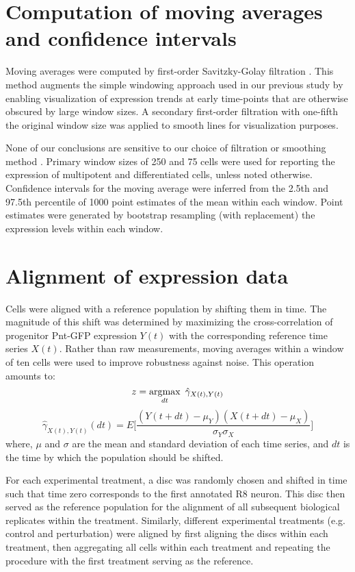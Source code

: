\section{Computation of moving averages and confidence intervals}
\label{appendix:ratio:moving_averages}

Moving averages were computed by first-order Savitzky-Golay filtration \cite{Savitzky1964}. This method augments the simple windowing approach used in our previous study \cite{Pelaez2015a} by enabling visualization of expression trends at early time-points that are otherwise obscured by large window sizes. A secondary first-order filtration with one-fifth the original window size was applied to smooth lines for visualization purposes.

None of our conclusions are sensitive to our choice of filtration or smoothing method \cite{Pelaez2015a}. Primary window sizes of 250 and 75 cells were used for reporting the expression of multipotent and differentiated cells, unless noted otherwise. Confidence intervals for the moving average were inferred from the 2.5th and 97.5th percentile of 1000 point estimates of the mean within each window. Point estimates were generated by bootstrap resampling (with replacement) the expression levels within each window.

\section{Alignment of expression data}
\label{appendix:ratio:alignment}

Cells were aligned with a reference population by shifting them in time. The magnitude of this shift was determined by maximizing the cross-correlation of progenitor Pnt-GFP expression $Y(t)$ with the corresponding reference time series $X(t)$. Rather than raw measurements, moving averages within a window of ten cells were used to improve robustness against noise. This operation amounts to:
\begin{equation}
z = \argmax_{dt} \ {\hat{\gamma}_{X(t),Y(t)}}
\end{equation}
\begin{equation}
\hat{\gamma}_{X(t),Y(t)} (dt) = E \Big[ \frac{(Y(t+dt)-\mu_Y)(X(t+dt)-\mu_X)}{\sigma_Y \sigma_X} \Big]
\end{equation}
where, $\mu$ and $\sigma$ are the mean and standard deviation of each time series, and $dt$ is the time by which the population should be shifted.

For each experimental treatment, a disc was randomly chosen and shifted in time such that time zero corresponds to the first annotated R8 neuron. This disc then served as the reference population for the alignment of all subsequent biological replicates within the treatment. Similarly, different experimental treatments (e.g. control and perturbation) were aligned by first aligning the discs within each treatment, then aggregating all cells within each treatment and repeating the procedure with the first treatment serving as the reference.

